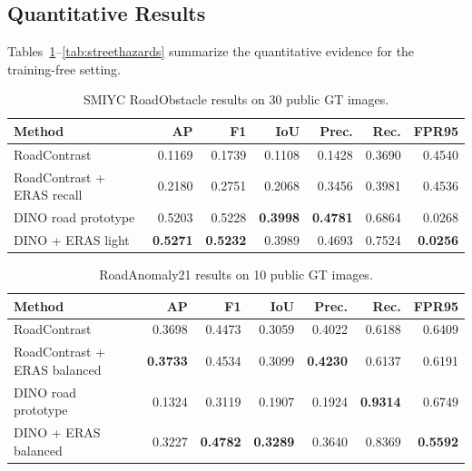 \documentclass[runningheads]{llncs}
\begin{document}
\subsection{Quantitative Results}

Tables~\ref{tab:smiyc}--\ref{tab:streethazards} summarize the quantitative evidence for the training-free setting.

\begin{table}
\centering
\small
\caption{SMIYC RoadObstacle results on 30 public GT images.}
\label{tab:smiyc}
\begin{tabular}{lrrrrrr}
\toprule
Method & AP & F1 & IoU & Prec. & Rec. & FPR95 \\
\midrule
RoadContrast & 0.1169 & 0.1739 & 0.1108 & 0.1428 & 0.3690 & 0.4540 \\
RoadContrast + ERAS recall & 0.2180 & 0.2751 & 0.2068 & 0.3456 & 0.3981 & 0.4536 \\
DINO road prototype & 0.5203 & 0.5228 & \textbf{0.3998} & \textbf{0.4781} & 0.6864 & 0.0268 \\
DINO + ERAS light & \textbf{0.5271} & \textbf{0.5232} & 0.3989 & 0.4693 & 0.7524 & \textbf{0.0256} \\
\bottomrule
\end{tabular}
\end{table}

\begin{table}
\centering
\small
\caption{RoadAnomaly21 results on 10 public GT images.}
\label{tab:roadanomaly}
\begin{tabular}{lrrrrrr}
\toprule
Method & AP & F1 & IoU & Prec. & Rec. & FPR95 \\
\midrule
RoadContrast & 0.3698 & 0.4473 & 0.3059 & 0.4022 & 0.6188 & 0.6409 \\
RoadContrast + ERAS balanced & \textbf{0.3733} & 0.4534 & 0.3099 & \textbf{0.4230} & 0.6137 & 0.6191 \\
DINO road prototype & 0.1324 & 0.3119 & 0.1907 & 0.1924 & \textbf{0.9314} & 0.6749 \\
DINO + ERAS balanced & 0.3227 & \textbf{0.4782} & \textbf{0.3289} & 0.3640 & 0.8369 & \textbf{0.5592} \\
\bottomrule
\end{tabular}
\end{table}
\end{document}
